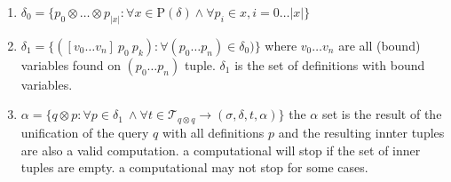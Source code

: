 \documentclass[11pt,a4paper]{report}
\newcommand{\unify}{\otimes}
\begin{document}
\begin{enumerate}
    \item $\delta_{0} = \{ p_{0} \unify \ldots \unify p_{|x|} : \forall x \in \mathrm{P}(\delta) \wedge \forall p_{i} \in x, i=0 \ldots |x| \}$
    \item $\delta_{1} = \{ ([v_{0} \ldots v_{n}]\ p_{0}\ p_{k}): \forall (p_{0} \ldots p_{n}) \in \delta_{0})\}$
    \subitem where $v_{0} \ldots v_{n}$ are all (bound) variables found on $(p_{0} \ldots p_{n})$ tuple.
    \subitem $\delta_{1}$ is the set of definitions with bound variables.
    \item $\alpha = \{q \unify p :\forall p \in \delta_{1}\ \wedge \forall t \in \mathcal{T}_{q \unify q} \rightarrow (\sigma, \delta, t, \alpha) \}$
    \subitem the $\alpha$ set is the result of the unification of the query $q$ with all definitions $p$ and the resulting innter tuples are
    also a valid computation.
    \subitem a computational will stop if the set of inner tuples are empty.
    \subitem a computational may not stop for some cases.
\end{enumerate}
\end{document}
